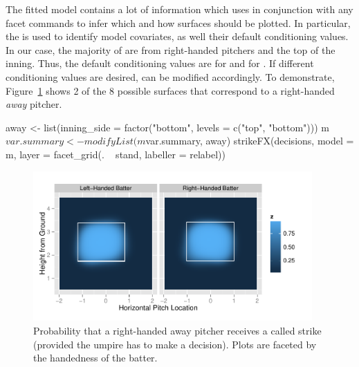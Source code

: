 \begin{article}
The fitted model  contains a lot of information which 
uses in conjunction with any  facet commands to infer
which and how surfaces should be plotted. In particular, the 
is used to identify model covariates, as well their default conditioning
values. In our case, the majority of  are from right-handed
pitchers and the top of the inning. Thus, the default conditioning
values are  for  and 
for . If different conditioning values are desired,
 can be modified accordingly. To demonstrate, Figure~\ref{fig:strike-probs}
shows 2 of the 8 possible surfaces that correspond to a right-handed
\emph{away} pitcher.
%
\begin{Schunk}
\begin{Sinput}
away <- list(inning_side = factor("bottom", levels = c("top", "bottom")))
m$var.summary <- modifyList(m$var.summary, away)
strikeFX(decisions, model = m, layer = facet_grid(. ~ stand, labeller = relabel))
\end{Sinput}
\end{Schunk}
%
\begin{figure}[h]
\centerline{\includegraphics[width=0.95\textwidth]{prob-strike.pdf}}

\caption{\label{fig:strike-probs}Probability that a right-handed away pitcher
receives a called strike (provided the umpire has to make a decision).
Plots are faceted by the handedness of the batter.}
\end{figure}



\end{article}
